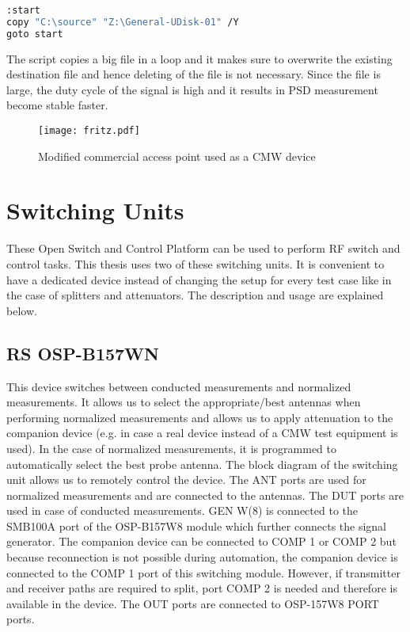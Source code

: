 \begin{lstlisting}[language=bash]
:start
copy "C:\source" "Z:\General-UDisk-01" /Y
goto start
\end{lstlisting}

The script copies a big file in a loop and it makes sure to overwrite the existing destination file and hence deleting of the file is not necessary. Since the file is large, the duty cycle of the signal is high and it results in \acf{PSD} measurement become stable faster. 

\begin{figure}[H]
\centering
\texttt{[image: fritz.pdf]}
\vspace{-0.4cm}
\caption{Modified commercial access point used as a \acf{CMW} device}
\label{fig:cmwGUI}
\end{figure}

\section{Switching Units}
These Open Switch and Control Platform can be used to perform \acs{RF} switch and control tasks. This thesis uses two of these switching units. It is convenient to have a dedicated device instead of changing the setup for every test case like in the case of splitters and attenuators. The description and usage are explained below.

\subsection{\acs{RS}\textregistered{} \ac{OSP}-B157WN} \label{sec:wn}
This device switches between conducted measurements and normalized measurements. It allows us to select the appropriate/best antennas when performing normalized measurements and allows us to apply attenuation to the companion device (e.g. in case a real device instead of a \acs{CMW} test equipment is used). In the case of normalized measurements, it is programmed to automatically select the best probe antenna. The block diagram of the switching unit allows us to remotely control the device. The ANT ports are used for normalized measurements and are connected to the antennas. The \acs{DUT} ports are used in case of conducted measurements. GEN W(8) is connected to the SMB100A port of the \acs{OSP}-B157W8 module which further connects the signal generator. The companion device can be connected to COMP 1 or COMP 2 but because reconnection is not possible during automation, the companion device is connected to the COMP 1 port of this switching module. However, if transmitter and receiver paths are required to split, port COMP 2 is needed and therefore is available in the device.
The OUT ports are connected to \acs{OSP}-157W8 PORT ports.

